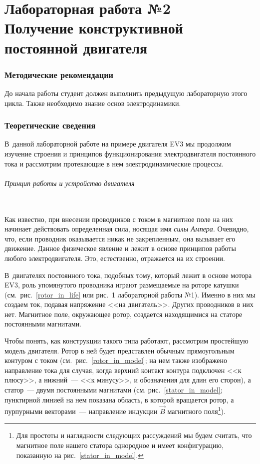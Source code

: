 \documentclass[12pt, a4paper, openany]{extarticle}
\begin{document}
\part*{Лабораторная работа №2\\
Получение конструктивной постоянной двигателя}

\section{Методические рекомендации}
\hspace*{\parindent}До начала работы студент должен выполнить предыдущую лабораторную этого цикла.
Также необходимо знание основ электродинамики.

\section{Теоретические сведения}
\hspace*{\parindent}В~данной лабораторной работе на примере двигателя EV3 мы продолжим изучение строения и принципов функционирования электродвигателя постоянного тока и рассмотрим протекающие в нем электродинамические процессы.

\paragraph*{Принцип работы и устройство двигателя}$\phantom{-}$\\
\hspace*{\parindent}Как известно, при внесении проводников с током в магнитное поле на них начинает действовать определенная сила, носящая имя \textit{силы Ампера}. 
Очевидно, что, если проводник оказывается никак не закрепленным, она вызывает его движение. 
Данное физическое явление и лежит в основе принципов работы любого электродвигателя. 
Это, естественно, отражается на их строении.

В~двигателях постоянного тока, подобных тому, который лежит в основе мотора EV3, роль упомянутого проводника играют размещаемые на роторе катушки (см.~рис.~\ref{rotor_in_life} или рис.~1 лабораторной работы №1). 
Именно в них мы создаем ток, подавая напряжение <<на двигатель>>. 
Других проводников в них нет. 
Магнитное поле, окружающее ротор, создается находящимися на статоре постоянными магнитами. 

Чтобы понять, как конструкции такого типа работают, рассмотрим простейшую модель двигателя. 
Ротор в ней будет представлен обычным прямоугольным контуром с током (см.~рис.~\ref{rotor_in_model}; на нем также изображено направление тока для случая, когда верхний контакт контура подключен <<к плюсу>>, а нижний~--- <<к минусу>>, и обозначения для длин его сторон), а статор~--- двумя постоянными магнитами (см. рис.~\ref{stator_in_model}; пунктирной линией на нем показана область, в которой вращается ротор, а пурпурными векторами~--- направление индукции $\vec{B}$ магнитного поля\footnote{Для простоты и наглядности следующих рассуждений мы будем считать, что магнитное поле нашего статора однородное и имеет конфигурацию, показанную на рис.~\ref{stator_in_model}.}). 
\end{document}
